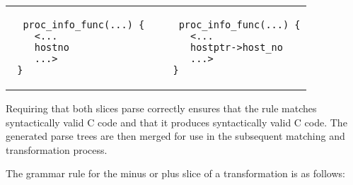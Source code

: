 \documentclass{article}
\newcommand{\sizecodebis}[0]{\scriptsize}
\begin{document}
{%
\begin{center}
\begin{tabular}{p{3cm}p{5cm}p{3cm}}
\begin{verbatim}
  proc_info_func(...) {
    <...
    hostno
    ...>
 }
\end{verbatim}
&&
\begin{verbatim}
  proc_info_func(...) {
    <...
    hostptr->host_no
    ...>
 }
\end{verbatim}
\end{tabular}
\end{center}
}

\noindent
Requiring that both slices parse correctly ensures that the rule matches
syntactically valid C code and that it produces syntactically valid C code.
The generated parse trees are then merged for use in the subsequent
matching and transformation process.

The grammar rule for the minus or plus slice of a transformation is as follows:
\end{document}
